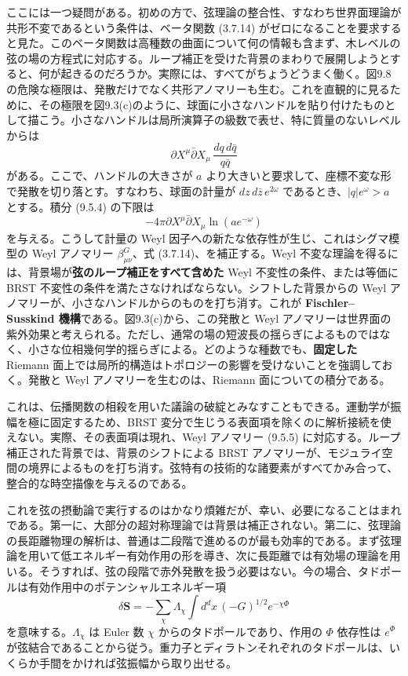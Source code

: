ここには一つ疑問がある。初めの方で、弦理論の整合性、すなわち世界面理論が共形不変であるという条件は、ベータ関数 (3.7.14) がゼロになることを要求すると見た。このベータ関数は高種数の曲面について何の情報も含まず、木レベルの弦の場の方程式に対応する。ループ補正を受けた背景のまわりで展開しようとすると、何が起きるのだろうか。実際には、すべてがちょうどうまく働く。図9.8の危険な極限は、発散だけでなく共形アノマリーも生む。これを直観的に見るために、その極限を図9.3(c)のように、球面に小さなハンドルを貼り付けたものとして描こう。小さなハンドルは局所演算子の級数で表せ、特に質量のないレベルからは
\begin{equation}
\partial X^\mu\bar\partial X_\mu\,\frac{dq\,d\bar q}{q\bar q}
\tag{9.5.4}\label{eq:9.5.4}
\end{equation}
がある。ここで、ハンドルの大きさが $a$ より大きいと要求して、座標不変な形で発散を切り落とす。すなわち、球面の計量が $dz\,d\bar z\,e^{2\omega}$ であるとき、$|q|e^\omega>a$ とする。積分 (9.5.4) の下限は
\begin{equation}
-4\pi\partial X^\mu\bar\partial X_\mu\ln(ae^{-\omega})
\tag{9.5.5}\label{eq:9.5.5}
\end{equation}
を与える。こうして計量の Weyl 因子への新たな依存性が生じ、これはシグマ模型の Weyl アノマリー $\beta_{\mu\nu}^G$、式 (3.7.14)、を補正する。Weyl 不変な理論を得るには、背景場が\textbf{弦のループ補正をすべて含めた} Weyl 不変性の条件、または等価に BRST 不変性の条件を満たさなければならない。シフトした背景からの Weyl アノマリーが、小さなハンドルからのものを打ち消す。これが \textbf{Fischler--Susskind 機構}である。図9.3(c)から、この発散と Weyl アノマリーは世界面の紫外効果と考えられる。ただし、通常の場の短波長の揺らぎによるものではなく、小さな位相幾何学的揺らぎによる。どのような種数でも、\textbf{固定した} Riemann 面上では局所的構造はトポロジーの影響を受けないことを強調しておく。発散と Weyl アノマリーを生むのは、Riemann 面についての積分である。

これは、伝播関数の相殺を用いた議論の破綻とみなすこともできる。運動学が振幅を極に固定するため、BRST 変分で生じうる表面項を除くのに解析接続を使えない。実際、その表面項は現れ、Weyl アノマリー (9.5.5) に対応する。ループ補正された背景では、背景のシフトによる BRST アノマリーが、モジュライ空間の境界によるものを打ち消す。弦特有の技術的な諸要素がすべてかみ合って、整合的な時空描像を与えるのである。

これを弦の摂動論で実行するのはかなり煩雑だが、幸い、必要になることはまれである。第一に、大部分の超対称理論では背景は補正されない。第二に、弦理論の長距離物理の解析は、普通は二段階で進めるのが最も効率的である。まず弦理論を用いて低エネルギー有効作用の形を導き、次に長距離では有効場の理論を用いる。そうすれば、弦の段階で赤外発散を扱う必要はない。今の場合、タドポールは有効作用中のポテンシャルエネルギー項
\begin{equation}
\delta\boldsymbol S=-\sum_\chi\Lambda_\chi
\int d^dx\,(-G)^{1/2}e^{-\chi\Phi}
\tag{9.5.6}\label{eq:9.5.6}
\end{equation}
を意味する。$\Lambda_\chi$ は Euler 数 $\chi$ からのタドポールであり、作用の $\Phi$ 依存性は $e^\Phi$ が弦結合であることから従う。重力子とディラトンそれぞれのタドポールは、いくらか手間をかければ弦振幅から取り出せる。

